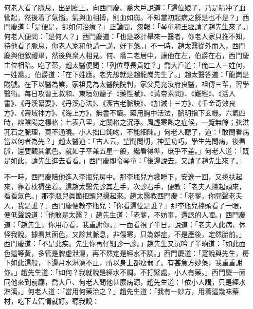 何老人看了脈息，出到廳上，向西門慶、喬大戶說道：「這位娘子，乃是精冲了血管起，{}然後着了氣惱。氣與血相搏，則血如崩。{}不知當初起病之繇是也不是？」西門慶道：「是便是，卻如何治療？」正論間，忽報：「琴童和王經請了趙先生來了。」何老人便問：「是何人？」西門慶道：「也是夥計舉來一醫者，你老人家只推不知，待他看了脈息，你老人家和他講一講，好下藥。」不一時，趙太醫從外而入，西門慶與他叙禮畢，然後與衆人相見。何、喬二老居中，讓他在左，伯爵在右，西門慶主位相陪。吃了茶，趙太醫便問：「列位尊長貴姓？」喬大戶道：「俺二人一姓何，一姓喬。」伯爵道：「在下姓應。老先想就是趙龍崗先生了。」趙太醫答道：「龍崗是賤號。{}在下以醫為業，家祖見為太醫院院判，家父見充汝府良醫，祖傳三輩，習學醫術。{}每日攻習王叔和、東垣勿聽子《藥性賦》、《黃帝素問》、《難經》、《活人書》、《丹溪纂要》、《丹溪心法》、《潔古老脈訣》、《加減十三方》、《千金奇效良方》、《壽域神方》、《海上方》，無書不讀。藥用胸中活法，脈明指下玄機。六氣四時，辨陰陽之標格；七表八里，定關格之沉浮。{}風虛寒熱之症候，一覽無餘；弦洪芤石之脈理，莫不通曉。小人拙口鈍吻，不能細陳。」何老人聽了，道：「敢問看病當以何者為先？」趙太醫道：「古人云，望聞問切，神聖功巧。學生先問病，後看脈，還要觀其氣色。就如子平兼五星一般，{}纔看得準，庶乎不差。」何老人道：「既是如此，請先生進去看看。」西門慶即令琴童：「後邊說去，又請了趙先生來了。」

不一時，西門慶陪他進入李瓶兒房中。那李瓶兒方纔睡下，安逸一回，{}又搊扶起來，靠着枕褥坐着。這趙太醫先診其左手，次診右手，便教：「老夫人擡起頭來，看看氣色。」那李瓶兒眞箇把頭兒揚起來。趙太醫教西門慶：「老爹，你問聲老夫人，我是誰？」{}西門慶便教李瓶兒：「你看這位是誰？」那李瓶兒擡頭看了一眼，便低聲說道：「他敢是太醫？」趙先生道：「老爹，不妨事，還認的人哩。」{}西門慶道：「趙先生，你用心看，我重謝你。」一面看視了半日，說道：「老夫人此病，休怪我說，據看其面色，又診其脈息，非傷寒，只為雜症，不是產後，定然胎前。」西門慶道：「不是此疾。先生你再仔細診一診。」趙先生又沉吟了半晌道：「如此面色這等黃，多管是脾虛泄瀉，再不然定是經水不調。」西門慶道：「寔說與先生，房下如此這般，下邊月水淋漓不止，所以身上都瘦弱了。有甚急方妙藥，我重重謝你。」趙先生道：「如何？我就說是經水不調。不打緊處，小人有藥。」{}西門慶一面同他來到前廳，喬大戶、何老人問他甚麼病源，趙先生道：「依小人講，只是經水淋漓。」何老人道：「當用何藥治之？」趙先生道：「我有一妙方，用着這幾味藥材，吃下去管情就好。聽我說：

